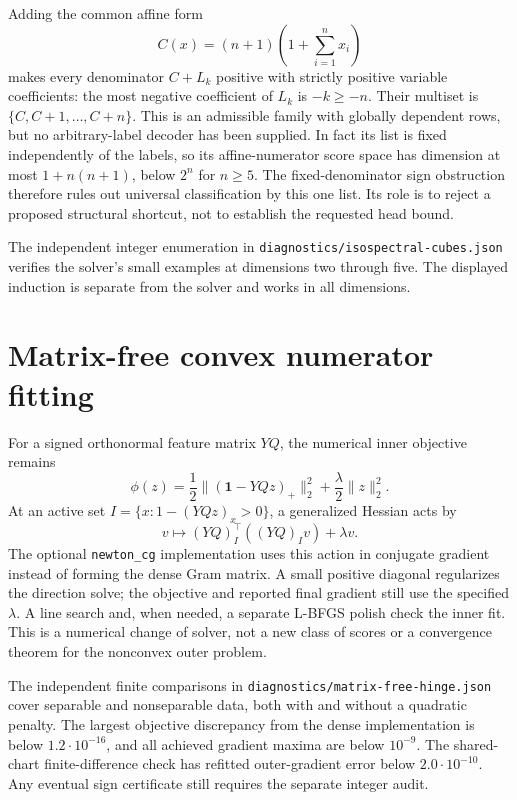 \documentclass[11pt]{article}
\begin{document}
Adding the common affine form
\[
 C(x)=(n+1)\left(1+\sum_{i=1}^n x_i\right)
\]
makes every denominator $C+L_k$ positive with strictly positive variable
coefficients: the most negative coefficient of $L_k$ is $-k\ge-n$.
Their multiset is $\{C,C+1,\ldots,C+n\}$. This is an admissible
family with globally dependent rows, but no arbitrary-label decoder
has been supplied. In fact its list is fixed independently of the
labels, so its affine-numerator score space has dimension at most
$1+n(n+1)$, below $2^n$ for $n\ge5$. The fixed-denominator sign
obstruction therefore rules out universal classification by this one
list. Its role is to reject a proposed structural shortcut, not to
establish the requested head bound.

The independent integer enumeration in
\texttt{diagnostics/isospectral-cubes.json} verifies the solver's small
examples at dimensions two through five. The displayed induction is
separate from the solver and works in all dimensions.


\section{Matrix-free convex numerator fitting}

For a signed orthonormal feature matrix $YQ$, the numerical inner
objective remains
\[
 \phi(z)=\frac12\|(\mathbf1-YQz)_+\|_2^2+\frac\lambda2\|z\|_2^2.
\]
At an active set $I=\{x:1-(YQz)_x>0\}$, a generalized Hessian acts by
\[
 v\longmapsto (YQ)_I^\top((YQ)_Iv)+\lambda v.
\]
The optional \texttt{newton\_cg} implementation uses this action in
conjugate gradient instead of forming the dense Gram matrix. A small
positive diagonal regularizes the direction solve; the objective and
reported final gradient still use the specified $\lambda$. A line
search and, when needed, a separate L-BFGS polish check the inner fit.
This is a numerical change of solver, not a new class of scores or a
convergence theorem for the nonconvex outer problem.

The independent finite comparisons in
\texttt{diagnostics/matrix-free-hinge.json} cover separable and
nonseparable data, both with and without a quadratic penalty.
The largest objective discrepancy from the dense implementation is
below $1.2\cdot10^{-16}$, and all achieved gradient maxima are below
$10^{-9}$. The shared-chart finite-difference check has refitted
outer-gradient error below $2.0\cdot10^{-10}$. Any eventual sign
certificate still requires the separate integer audit.
\end{document}
